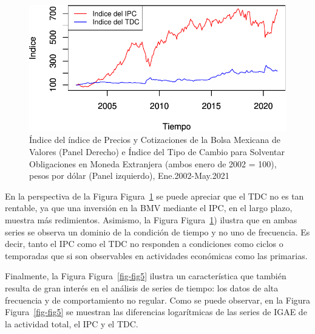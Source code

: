 \documentclass[
  a4paper,
]{article}
\begin{document}
\begin{figure}[H]

\caption{\label{fig-fig4}Índice del índice de Precios y Cotizaciones de
la Bolsa Mexicana de Valores (Panel Derecho) e Índice del Tipo de Cambio
para Solventar Obligaciones en Moneda Extranjera (ambos enero de 2002 =
100), pesos por dólar (Panel izquierdo), Ene.2002-May.2021}

{\centering \includegraphics{index_files/figure-pdf/fig-fig4-1.pdf}

}

\end{figure}

En la perspectiva de la Figura Figura~\ref{fig-fig4} se puede apreciar
que el TDC no es tan rentable, ya que una inversión en la BMV mediante
el IPC, en el largo plazo, muestra más redimientos. Asimismo, la Figura
Figura~\ref{fig-fig4}) ilustra que en ambas series se observa un dominio
de la condición de tiempo y no uno de frecuencia. Es decir, tanto el IPC
como el TDC no responden a condiciones como ciclos o temporadas que si
son observables en actividades económicas como las primarias.

Finalmente, la Figura Figura~\ref{fig-fig5} ilustra un característica
que también resulta de gran interés en el análisis de series de tiempo:
los datos de alta frecuencia y de comportamiento no regular. Como se
puede observar, en la Figura Figura~\ref{fig-fig5} se muestran las
diferencias logarítmicas de las series de IGAE de la actividad total, el
IPC y el TDC.
\end{document}
